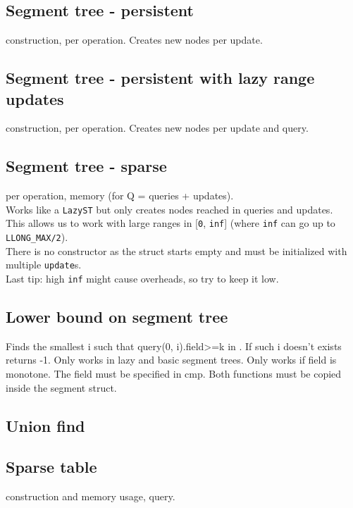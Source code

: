 \subsection{Segment tree - persistent}
 construction,  per operation.
Creates  new nodes per update.

\subsection{Segment tree - persistent with lazy range updates}
 construction,  per operation.
Creates  new nodes per update and query.

\subsection{Segment tree - sparse}
 per operation,  memory (for Q = queries + updates).\\
Works like a \verb|LazyST| but only creates nodes reached in queries and updates.\\
This allows us to work with large ranges in [\verb|0|, \verb|inf|] (where \verb|inf| can go up to \verb|LLONG_MAX/2|).\\
There is no constructor as the struct starts empty and must be initialized with multiple \verb|update|s.\\
Last tip: high \verb|inf| might cause overheads, so try to keep it low.

\subsection{Lower bound on segment tree}
Finds the smallest i such that query(0, i).field>=k in .
If such i doesn't exists returns -1.
Only works in lazy and basic segment trees.
Only works if field is monotone. The field must be specified in cmp.
Both functions must be copied inside the segment struct.


\subsection{Union find}

\subsection{Sparse table}
 construction and memory usage,  query.

